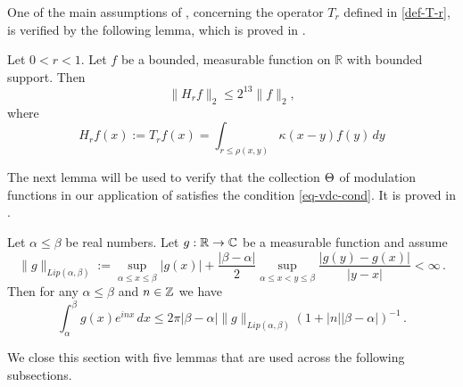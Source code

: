 One of the main assumptions of , concerning the operator $T_r$ defined in \eqref{def-T-r}, is verified by the following lemma, which is proved in .
\begin{lemma}
    \label{Hilbert-strong-2-2}
    \leanok
    Let $0<r<1$. Let $f$ be a bounded, measurable function on $\mathbb{R}$ with bounded support. Then
    \begin{equation}
        \label{eq-Hr-L2-bound}
        \|H_rf\|_{2}\leq 2^{13} \|f\|_2,
    \end{equation}
    where
    \begin{equation}
        \label{def-H-r}
        H_r f(x) := T_r f(x) = \int_{r\le\rho(x,y)} \kappa(x-y) f(y) \, dy
    \end{equation}
\end{lemma}

The next lemma will be used to verify that the collection ${\Theta}$ of modulation functions in our application of  satisfies the condition \eqref{eq-vdc-cond}.
It is proved in .

\begin{lemma}
\label{van-der-Corput}
\leanok
{}
    Let $\alpha\le\beta$ be real numbers. Let $g:{\mathbb{R}}\to \mathbb{C}$ be a measurable function and assume
    \begin{equation}
        \|g\|_{Lip(\alpha,\beta)}:=\sup_{\alpha\le x\le \beta}|g(x)|+\frac{|\beta-\alpha|}{2}
        \sup_{\alpha\le x<y\le \beta} \frac {|g(y)-g(x)|}{|y-x|}<\infty\, .
    \end{equation}
    Then for any $\alpha \le \beta$ and $n\in{\mathbb{Z}}$ we have
    \begin{equation}
        \int _{\alpha}^{\beta} g(x) e^{inx}\, dx\le 2\pi |\beta-\alpha|\|g\|_{Lip(\alpha,\beta)}(1+|n||\beta-\alpha|)^{-1}\, .
    \end{equation}

\end{lemma}


We close this section with five lemmas that are used
across the following subsections.

